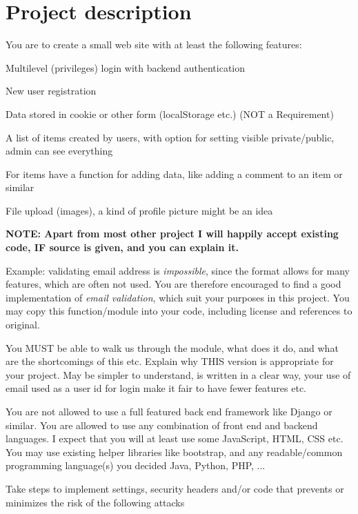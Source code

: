 \documentclass[a4paper,11pt,notitlepage]{report}
\begin{document}
\section*{Project description}

You are to create a small web site with at least the following features:

\begin{list2}
\item Multilevel (privileges) login with backend authentication
\item New user registration
\item Data stored in cookie or other form (localStorage etc.) (NOT a Requirement)
\item A list of items created by users, with option for setting visible private/public, admin can see everything
\item For items have a function for adding data, like adding a comment to an item or similar
\item File upload (images), a kind of profile picture might be an idea
\end{list2}

{\bf NOTE: Apart from most other project I will happily accept existing code, IF source is given, and you can explain it.}

Example: validating email address is \emph{impossible}, since the format allows for many features, which are often not used. You are therefore encouraged to find a good implementation of \emph{email validation}, which suit your purposes in this project. You may copy this function/module into your code, including license and references to original.

You MUST be able to walk us through the module, what does it do, and what are the shortcomings of this etc. Explain why THIS version is appropriate for your project. May be simpler to understand, is written in a clear way, your use of email used as a user id for login make it fair to have fewer features etc.

You are not allowed to use a full featured back end framework like Django or similar. You are allowed to use any combination of front end and backend languages. I expect that you will at least use some JavaScript, HTML, CSS etc. You may use existing helper libraries like bootstrap, and any readable/common programming language(s) you decided Java, Python, PHP, ...

Take steps to implement settings, security headers and/or code that prevents or minimizes the risk of
the following attacks
\end{document}
